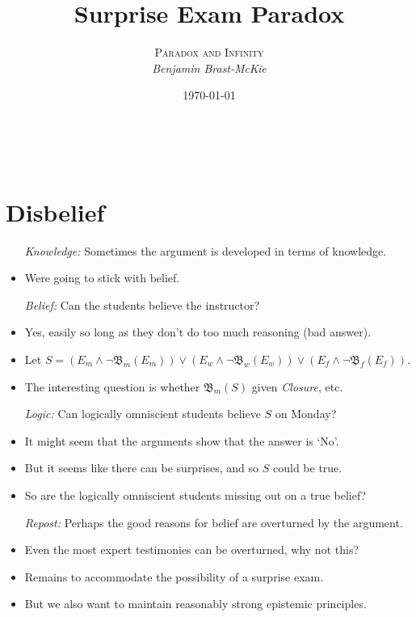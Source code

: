 \documentclass[a4paper, 11pt]{article} %
\title{\textbf{Surprise Exam Paradox}} %
\author{\textsc{Paradox and Infinity}\\ \em Benjamin Brast-McKie} %
\date{\today} %
\makeatletter
\newcommand{\B}{\mathfrak{B}}
\renewcommand{\maketitle}{ %
\begin{flushright} %
{\LARGE\@title} %

\vspace{10pt} %

{\@author} %
\\\@date %

\vspace{-30pt} %
\end{flushright}
}
\makeatother
\begin{document}
\maketitle %

\thispagestyle{empty}


\section*{Disbelief}

\begin{itemize}
  \item[\it Knowledge:] Sometimes the argument is developed in terms of knowledge.
    \item Were going to stick with belief.
  \item[\it Belief:] Can the students believe the instructor?
    \item Yes, easily so long as they don't do too much reasoning (bad answer).
    \item Let $S = (E_m \wedge \neg \B_m(E_m)) \vee (E_w \wedge \neg \B_w(E_w)) \vee (E_f \wedge \neg \B_f(E_f))$.
    \item The interesting question is whether $\B_m(S)$ given \textit{Closure}, etc. 
  \item[\it Logic:] Can logically omniscient students believe $S$ on Monday?
    \item It might seem that the arguments show that the answer is `No'. 
    \item But it seems like there can be surprises, and so $S$ could be true. 
    \item So are the logically omniscient students missing out on a true belief?
  \item[\it Repost:] Perhaps the good reasons for belief are overturned by the argument.
    \item Even the most expert testimonies can be overturned, why not this?
    \item Remains to accommodate the possibility of a surprise exam.
    \item But we also want to maintain reasonably strong epistemic principles.
\end{itemize}
\end{document}
